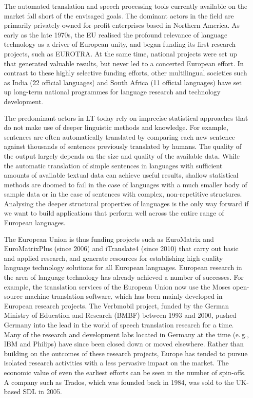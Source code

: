 \documentclass[]{../metanetpaper}
\begin{document}
\begin{multicols}{2}
The automated translation and speech processing tools currently available on the market fall short of the envisaged goals. The dominant actors in the field are primarily privately-owned for-profit enterprises based in Northern America. As early as the late 1970s, the EU realised the profound relevance of language technology as a driver of European unity, and began funding its first research projects, such as EUROTRA. At the same time, national projects were set up that generated valuable results, but never led to a concerted European effort. In contrast to these highly selective funding efforts, other multilingual societies such as India (22 official languages) and South Africa (11 official languages) have set up long-term national programmes for language research and technology development. 

The predominant actors in LT today rely on imprecise statistical approaches that do not make use of deeper linguistic methods and knowledge. For example, sentences are often automatically translated by comparing each new sentence against thousands of sentences previously translated by humans. The quality of the output largely depends on the size and quality of the available  data. While the automatic translation of simple sentences in languages with sufficient amounts of available textual data can achieve useful results, shallow statistical methods are doomed to fail in the case of languages with a much smaller body of sample data or in the case of sentences with complex, non-repetitive structures. Analysing the deeper structural properties of languages is the only way forward if we want to build applications that perform well across the entire range of European languages.


The European Union is thus funding projects such as EuroMatrix and EuroMatrixPlus (since 2006) and iTranslate4 (since 2010) that carry out basic and applied research, and generate resources for establishing high quality language technology solutions for all European languages. 
European research in the area of language technology has already achieved a number of successes. For example, the translation services of the European Union now use the Moses open-source machine translation software, which has been mainly developed in European research projects. The Verbmobil project, funded by the German Ministry of Education and Research (BMBF) between 1993 and 2000, pushed Germany into the lead in the world of speech translation research for a time. Many of the research and development labs located in Germany at the time (e.\,g., IBM and Philips) have since been closed down or moved elsewhere. Rather than building on the outcomes of these research projects, Europe has tended to pursue isolated research activities with a less pervasive impact on the market. The economic value of even the earliest efforts can be seen in the number of spin-offs. A company such as Trados, which was founded back in 1984, was sold to the UK-based SDL in 2005.


\end{multicols}
\end{document}
